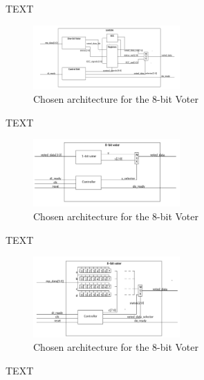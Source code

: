 \documentclass[a4paper]{IEEEtran}
\begin{document}
TEXT
\begin{figure}[h!]
  \centering
      \includegraphics[width=0.5\textwidth]{Figures/Solution/ArchitectureFinal}
  \caption{Chosen architecture for the 8-bit Voter}
  \label{fig:ArchitectureFinal}
\end{figure}
TEXT
\begin{figure}[h!]
  \centering
      \includegraphics[width=0.5\textwidth]{Figures/Solution/ArchitectureOption2}
  \caption{Chosen architecture for the 8-bit Voter}
  \label{fig:ArchitectureOption2}
\end{figure}
TEXT
\begin{figure}[h!]
  \centering
      \includegraphics[width=0.5\textwidth]{Figures/Solution/ArchitectureOption3}
  \caption{Chosen architecture for the 8-bit Voter}
  \label{fig:ArchitectureOption3}
\end{figure}

TEXT
\end{document}
